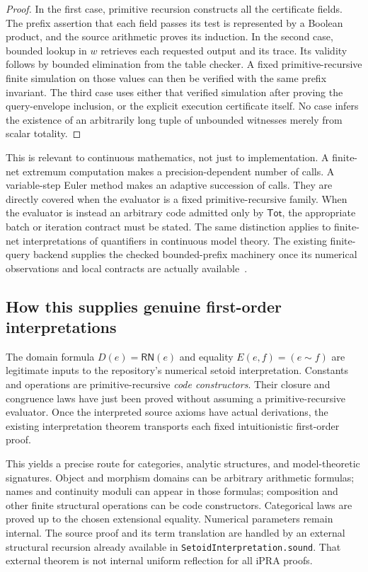 \begin{proof}
In the first case, primitive recursion constructs all the certificate
fields. The prefix assertion that each field passes its test is represented
by a Boolean product, and the source arithmetic proves its induction.
In the second case, bounded lookup in $w$ retrieves each requested output
and its trace. Its validity follows by bounded elimination from the table
checker. A fixed primitive-recursive finite simulation on those values can
then be verified with the same prefix invariant. The third case uses either
that verified simulation after proving the query-envelope inclusion, or the
explicit execution certificate itself. No case infers the existence of an
arbitrarily long tuple of unbounded witnesses merely from scalar totality.
\end{proof}

This is relevant to continuous mathematics, not just to implementation.
A finite-net extremum computation makes a precision-dependent number of
calls. A variable-step Euler method makes an adaptive succession of calls.
They are directly covered when the evaluator is a fixed primitive-recursive
family. When the evaluator is instead an arbitrary code admitted only by
$\mathsf{Tot}$, the appropriate batch or iteration contract must be stated.
The same distinction applies to finite-net interpretations of quantifiers
in continuous model theory. The existing finite-query backend supplies the
checked bounded-prefix machinery once its numerical observations and local
contracts are actually available~\cite{repo-finite-query}.

\subsection{How this supplies genuine first-order interpretations}

The domain formula $D(e)=\mathsf{RN}(e)$ and equality $E(e,f)=(e\sim f)$
are legitimate inputs to the repository's numerical setoid interpretation.
Constants and operations are primitive-recursive \emph{code constructors}.
Their closure and congruence laws have just been proved without assuming a
primitive-recursive evaluator. Once the interpreted source axioms have
actual derivations, the existing interpretation theorem transports each
fixed intuitionistic first-order proof.

This yields a precise route for categories, analytic structures, and
model-theoretic signatures. Object and morphism domains can be arbitrary
arithmetic formulas; names and continuity moduli can appear in those
formulas; composition and other finite structural operations can be code
constructors. Categorical laws are proved up to the chosen extensional
equality. Numerical parameters remain internal. The source proof and its
term translation are handled by an external structural recursion already
available in \texttt{SetoidInterpretation.sound}. That external theorem is
not internal uniform reflection for all iPRA proofs.

